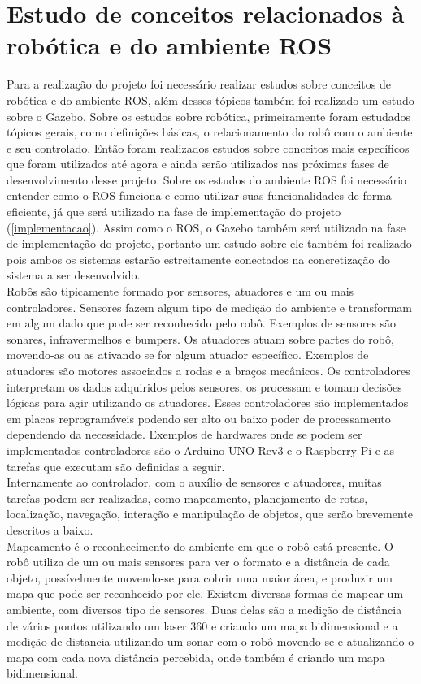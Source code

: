 \documentclass[12pt]{report}
\begin{document}
\section{Estudo de conceitos relacionados à robótica e do ambiente ROS}
Para a realização do projeto foi necessário realizar estudos sobre conceitos de robótica e do ambiente ROS, além desses tópicos também foi realizado um estudo sobre o Gazebo. Sobre os estudos sobre robótica, primeiramente foram estudados tópicos gerais, como definições básicas, o relacionamento do robô com o ambiente e seu controlado. Então foram realizados estudos sobre conceitos mais específicos que foram utilizados até agora e ainda serão utilizados nas próximas fases de desenvolvimento desse projeto. Sobre os estudos do ambiente ROS foi necessário entender como o ROS funciona e como utilizar suas funcionalidades de forma eficiente, já que será utilizado na fase de implementação do projeto (\ref{implementacao}). Assim como o ROS, o Gazebo também será utilizado na fase de implementação do projeto, portanto um estudo sobre ele também foi realizado pois ambos os sistemas estarão estreitamente conectados na concretização do sistema a ser desenvolvido.\\
Robôs são tipicamente formado por sensores, atuadores e um ou mais controladores. Sensores fazem algum tipo de medição do ambiente e transformam em algum dado que pode ser reconhecido pelo robô. Exemplos de sensores são sonares, infravermelhos e bumpers. Os atuadores atuam sobre partes do robô, movendo-as ou as ativando se for algum atuador específico. Exemplos de atuadores são motores associados a rodas e a braços mecânicos. Os controladores interpretam os dados adquiridos pelos sensores, os processam e tomam decisões lógicas para agir utilizando os atuadores. Esses controladores são implementados em placas reprogramáveis podendo ser alto ou baixo poder de processamento dependendo da necessidade. Exemplos de hardwares onde se podem ser implementados controladores são o Arduino UNO Rev3 e o Raspberry Pi e as tarefas que executam são definidas a seguir.\\
Internamente ao controlador, com o auxílio de sensores e atuadores, muitas tarefas podem ser realizadas, como mapeamento, planejamento de rotas, localização, navegação, interação e manipulação de objetos, que serão brevemente descritos a baixo.\\

Mapeamento é o reconhecimento do ambiente em que o robô está presente. O robô utiliza de um ou mais sensores para ver o formato e a distância de cada objeto, possívelmente movendo-se para cobrir uma maior área, e produzir um mapa que pode ser reconhecido por ele. Existem diversas formas de mapear um ambiente, com diversos tipo de sensores. Duas delas são a medição de distância de vários pontos utilizando um laser 360 e criando um mapa bidimensional e a medição de distancia utilizando um sonar com o robô movendo-se e atualizando o mapa com cada nova distância percebida, onde também é criando um mapa bidimensional.\\ 
\end{document}
